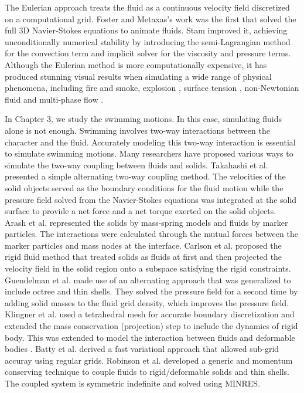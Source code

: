 The Eulerian approach treats the fluid as a continuous velocity field discretized
on a computational grid. Foster and Metaxas's work \cite{Foster:1996} was the first that
solved the full 3D Navier-Stokes equations to animate fluids.
Stam \cite{stam99stablefluids} improved it, achieving unconditionally
numerical stability by introducing the semi-Lagrangian
method for the convection term and implicit solver for
the viscosity and pressure terms. Although the Eulerian method is more computationally expensive, it has produced stunning visual results when simulating a wide range of physical phenomena, including fire and smoke\cite{Nguyen:2002,Fedkiw:2001}, explosion \cite{Yngve:2000}, surface tension \cite{Hong:2005,Wang:2005}, non-Newtonian fluid \cite{Goktekin:2004,Bargteil:2007} and multi-phase flow \cite{Losasso:2006,Ando:2015}.

In Chapter 3, we study the swimming motions. In this case, simulating fluids alone is not enough. Swimming involves two-way interactions between the character and the fluid. Accurately modeling this two-way interaction is essential to simulate swimming motions. Many researchers have proposed various ways to
simulate the two-way coupling between fluids and solids.  Takahashi et al. \cite{takahashi2002fluid-rigid}
presented a simple alternating two-way coupling method. The velocities of the solid
objects served as the boundary conditions for the fluid motion while the
pressure field solved from the Navier-Stokes equations was integrated at the
solid surface to provide a net force and a net torque exerted on the solid
objects. Arash et al. \cite{arash2003simulatingfluid-solid} represented the solids by mass-spring models and fluids by marker particles.  The interactions were calculated through the mutual forces between the marker particles and mass nodes at the interface. Carlson et al. \cite{carlson2004rigid} proposed the rigid
fluid method that treated solids as fluids at first
and then projected the velocity field in the solid region onto a subspace
satisfying the rigid constraints. Guendelman et al. \cite{guendelman2005thin} made use of an
alternating approach that was generalized to include octree and thin
shells.  They solved the pressure field for a
second time by adding solid masses to the fluid grid density, which improves
the pressure field. Klingner et al. \cite{klingner2006mesh} used a tetrahedral mesh for accurate boundary discretization and extended the mass conservation (projection) step
to include the dynamics of rigid body. This was extended to model the interaction between fluids and deformable bodies \cite{chentanez2006simultaneous}. Batty et al. \cite{batty2007fast} derived a fast variationl approach that allowed sub-grid accuray using regular grids. Robinson et al. \cite{robinson2008two} developed a generic and momentum
conserving technique to couple fluids to rigid/deformable solids and thin
shells. The coupled system is symmetric indefinite and solved using MINRES.


